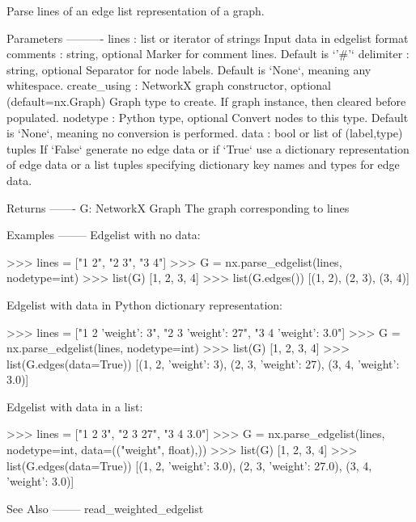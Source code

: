 \begin{DoxyVerb}Parse lines of an edge list representation of a graph.

Parameters
----------
lines : list or iterator of strings
    Input data in edgelist format
comments : string, optional
   Marker for comment lines. Default is `'#'`
delimiter : string, optional
   Separator for node labels. Default is `None`, meaning any whitespace.
create_using : NetworkX graph constructor, optional (default=nx.Graph)
   Graph type to create. If graph instance, then cleared before populated.
nodetype : Python type, optional
   Convert nodes to this type. Default is `None`, meaning no conversion is
   performed.
data : bool or list of (label,type) tuples
   If `False` generate no edge data or if `True` use a dictionary
   representation of edge data or a list tuples specifying dictionary
   key names and types for edge data.

Returns
-------
G: NetworkX Graph
    The graph corresponding to lines

Examples
--------
Edgelist with no data:

>>> lines = ["1 2", "2 3", "3 4"]
>>> G = nx.parse_edgelist(lines, nodetype=int)
>>> list(G)
[1, 2, 3, 4]
>>> list(G.edges())
[(1, 2), (2, 3), (3, 4)]

Edgelist with data in Python dictionary representation:

>>> lines = ["1 2 {'weight': 3}", "2 3 {'weight': 27}", "3 4 {'weight': 3.0}"]
>>> G = nx.parse_edgelist(lines, nodetype=int)
>>> list(G)
[1, 2, 3, 4]
>>> list(G.edges(data=True))
[(1, 2, {'weight': 3}), (2, 3, {'weight': 27}), (3, 4, {'weight': 3.0})]

Edgelist with data in a list:

>>> lines = ["1 2 3", "2 3 27", "3 4 3.0"]
>>> G = nx.parse_edgelist(lines, nodetype=int, data=(("weight", float),))
>>> list(G)
[1, 2, 3, 4]
>>> list(G.edges(data=True))
[(1, 2, {'weight': 3.0}), (2, 3, {'weight': 27.0}), (3, 4, {'weight': 3.0})]

See Also
--------
read_weighted_edgelist
\end{DoxyVerb}
 \mbox{\label{namespacenetworkx_1_1readwrite_1_1edgelist_a73553526045da6246d59f2669da6fccb}} 
